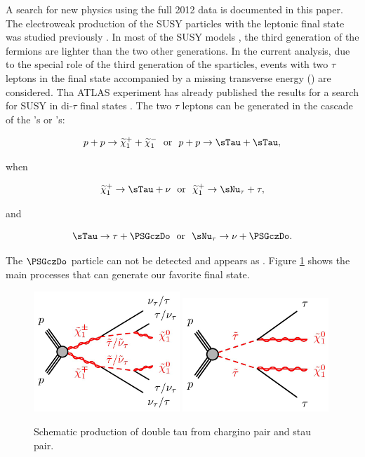 A search for new physics using the full 2012 data is documented in this paper. 
The electroweak production of the SUSY particles with the leptonic final state was studied previously \cite{Khachatryan:2014qwa}.
In most of the SUSY models \cite{Martin:1997ns}, the third generation of the fermions are lighter than the two other generations. 
In the current analysis, due to the special role of the third generation of the sparticles, events with two $\tau$ leptons in the final state 
accompanied by a missing transverse energy (\MET) are considered. 
Tha ATLAS experiment has already published the results for a search for SUSY in di-$\tau$ final states \cite{Aad:2014yka}.
The two $\tau$ leptons can be generated in the cascade of the \sTau's or \PSGcpDo's:
\begin{linenomath}
\begin{equation}
p + p \rightarrow \PSGcpDo +\PSGcmDo ~~\mathrm{or}~~  p + p \rightarrow \sTau + \sTau,
\end{equation}
\end{linenomath}
when 
\begin{linenomath}
\begin{equation}
\PSGcpDo \rightarrow \sTau + \nu ~~\mathrm{or}~~  \PSGcpDo \rightarrow \sNu_{\tau} + \tau,
\end{equation}
\end{linenomath}
and 
\begin{linenomath}
\begin{equation}
\sTau \rightarrow \tau + \PSGczDo ~~\mathrm{or}~~  \sNu_{\tau} \rightarrow \nu + \PSGczDo.
\end{equation}
\end{linenomath}
The $\PSGczDo$ particle can not be detected and appears as \MET.
Figure \ref{fig:Productions} shows the main processes that can generate our favorite final state.
\begin{figure}[!Hhtb]
\centering
\includegraphics[width=0.49\textwidth]{Introductionfigs/DiChargino.png}
\includegraphics[width=0.49\textwidth]{Introductionfigs/DiSTau.png}
\caption{Schematic production of double tau from chargino pair and stau pair.}
\label{fig:Productions}
\end{figure}
